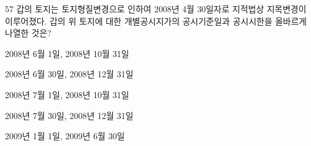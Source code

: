 \begin{question}{57}
갑의 토지는 토지형질변경으로 인하여 2008년 4월 30일자로 지적법상 지목변경이 이루어졌다. 갑의 위 토지에 대한 개별공시지가의 공시기준일과 공시시한을 올바르게 나열한 것은?
\begin{choices}
  \item 2008년 6월 1일, 2008년 10월 31일
  \item 2008년 6월 30일, 2008년 12월 31일
  \item 2008년 7월 1일, 2008년 10월 31일
  \item 2008년 7월 30일, 2008년 12월 31일
  \item 2009년 1월 1일, 2009년 6월 30일
\end{choices}
\end{question}

